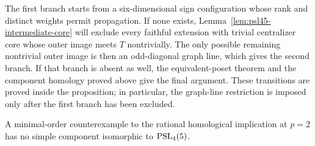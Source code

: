 The first branch starts from a six-dimensional sign configuration
whose rank and distinct weights permit propagation. If none exists,
Lemma~\ref{lem:psl45-intermediate-core} will exclude every faithful
extension with trivial centralizer core whose outer image meets $T$
nontrivially. The only possible remaining nontrivial outer image is
then an odd-diagonal graph line, which gives the second branch.
If that branch is absent as well, the equivalent-poset theorem and
the component homology proved above give the final argument.
These transitions are proved inside the proposition; in particular,
the graph-line restriction is imposed only after the first branch
has been excluded.

\begin{proposition}\label{prop:psl45}
A minimal-order counterexample to the rational homological
implication at $p=2$ has no simple component isomorphic to
$\operatorname{PSL}_4(5)$.
\end{proposition}

